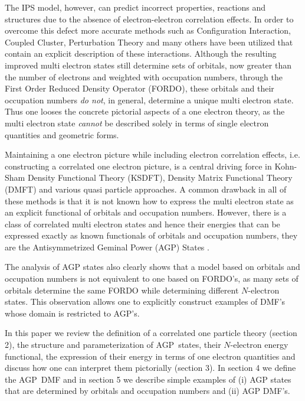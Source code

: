 \documentclass[aps,preprint]{revtex4}%
\begin{document}
The IPS model, however, can predict incorrect properties, reactions and
structures due to the absence of electron-electron correlation effects. In
order to overcome this defect more accurate methods such as Configuration
Interaction, Coupled Cluster, Perturbation Theory and many others have been
utilized that contain an explicit description of these interactions. Although
the resulting improved multi electron states still determine sets of orbitals,
now greater than the number of electrons and weighted with occupation numbers,
through the First Order Reduced Density Operator (FORDO), these orbitals and
their occupation numbers \emph{do not}, in general, determine a unique multi
electron state. Thus one looses the concrete pictorial aspects of a one
electron theory, as the multi electron state \emph{cannot} be described solely
in terms of single electron quantities and geometric forms.

Maintaining a one electron picture while including electron correlation
effects, i.e. constructing a correlated one electron picture, is a central
driving force in Kohn-Sham Density Functional Theory (KSDFT), Density Matrix
Functional Theory (DMFT) and various quasi particle approaches. A common
drawback in all of these methods is that it is not known how to express the
multi electron state as an explicit functional of orbitals and occupation
numbers. However, there is a class of correlated multi electron states and
hence their energies that can be expressed exactly as known functionals of
orbitals and occupation numbers, they are the Antisymmetrized Geminal Power
(AGP) States \cite{OrtizWeiner2006}.

The analysis of AGP states also clearly shows that a model based on orbitals
and occupation numbers is not equivalent to one based on FORDO's, as many sets
of orbitals determine the same FORDO while determining different $N$-electron
states. This observation allows one to explicitly construct examples of DMF's
whose domain is restricted to AGP's.

In this paper we review the definition of a correlated one particle theory
(section 2), the structure and parameterization of AGP\ states, their
$N$-electron energy functional, the expression of their energy in terms of one
electron quantities and discuss how one can interpret them pictorially
(section 3). In section 4 we define the AGP\ DMF and in section 5 we describe
simple examples of (i) AGP states that are determined by orbitals and
occupation numbers and (ii) AGP DMF's.
\end{document}

